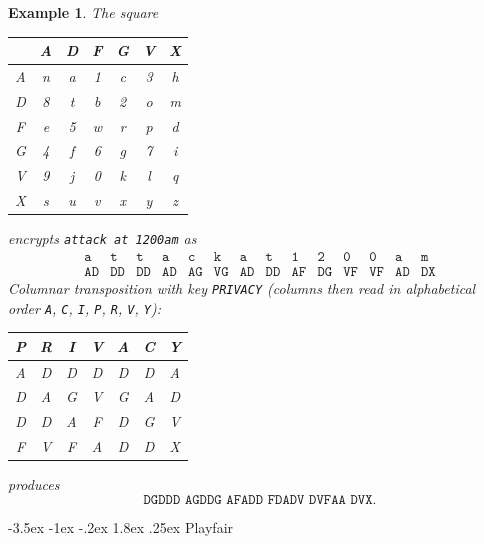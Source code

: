 \documentclass[11pt]{article}
\makeatletter
\renewcommand{\subsection}{\@startsection{subsection}{2}{\z@}%
    {-3.5ex \@plus -1ex \@minus -.2ex}%
    {1.8ex \@plus .25ex}%
    {\normalfont\large\bfseries}}
\newtheorem{example}[theorem]{Example}
\theoremstyle{remark}
\makeatother
\begin{document}
\begin{example}
The square
\begin{center}
\renewcommand{\arraystretch}{1.15}
\begin{tabular}{|c||c|c|c|c|c|c|}
\hline
 & A & D & F & G & V & X \\
\hline\hline
A & n & a & 1 & c & 3 & h \\
\hline
D & 8 & t & b & 2 & o & m \\
\hline
F & e & 5 & w & r & p & d \\
\hline
G & 4 & f & 6 & g & 7 & i \\
\hline
V & 9 & j & 0 & k & l & q \\
\hline
X & s & u & v & x & y & z \\
\hline
\end{tabular}
\end{center}
encrypts \texttt{attack at 1200am} as
\[
\begin{array}{cccccccccccccc}
\texttt{a}&\texttt{t}&\texttt{t}&\texttt{a}&\texttt{c}&\texttt{k}&
\texttt{a}&\texttt{t}&\texttt{1}&\texttt{2}&\texttt{0}&\texttt{0}&
\texttt{a}&\texttt{m}\\
\texttt{AD}&\texttt{DD}&\texttt{DD}&\texttt{AD}&\texttt{AG}&\texttt{VG}&
\texttt{AD}&\texttt{DD}&\texttt{AF}&\texttt{DG}&\texttt{VF}&\texttt{VF}&
\texttt{AD}&\texttt{DX}
\end{array}
\]
Columnar transposition with key \texttt{PRIVACY} (columns then read in
alphabetical order \texttt{A}, \texttt{C}, \texttt{I}, \texttt{P},
\texttt{R}, \texttt{V}, \texttt{Y}):
\begin{center}
\renewcommand{\arraystretch}{1.15}
\begin{tabular}{|c|c|c|c|c|c|c|}
\hline
P & R & I & V & A & C & Y \\
\hline
A & D & D & D & D & D & A \\
D & A & G & V & G & A & D \\
D & D & A & F & D & G & V \\
F & V & F & A & D & D & X \\
\hline
\end{tabular}
\end{center}
produces
\[
    \texttt{DGDDD AGDDG AFADD FDADV DVFAA DVX}.
\]
\end{example}

\subsection{Playfair}
\end{document}

